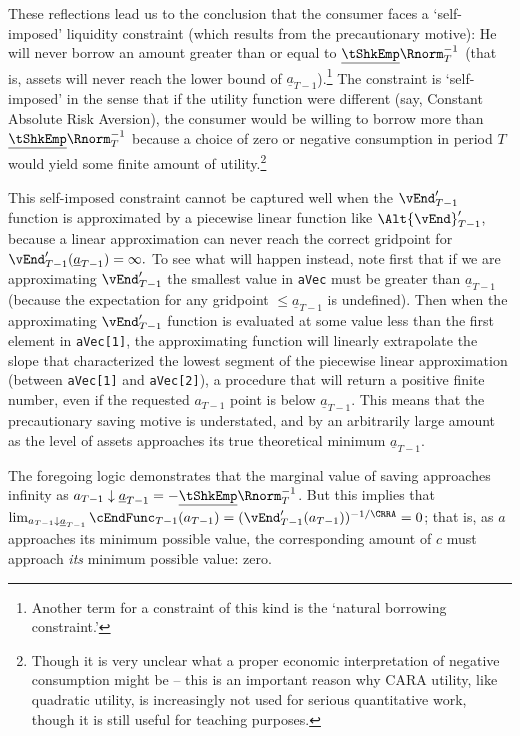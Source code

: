 \documentclass[titlepage]{\econtex}
\begin{document}
These reflections lead us to the conclusion that the consumer faces a
`self-imposed' liquidity constraint (which results from the
precautionary motive): He will never borrow an amount greater
than or equal to $\underline{\tShkEmp}\Rnorm_{T}^{-1}$ (that is,
assets will never reach the lower bound of
$\underline{a}_{T-1}$).\footnote{Another term for a constraint of this
  kind is the `natural borrowing constraint.'}  The constraint is
`self-imposed' in the sense that if the utility function were
different (say, Constant Absolute Risk Aversion), the consumer would
be willing to borrow more than $\underline{\tShkEmp}\Rnorm_{T}^{-1}$
because a choice of zero or negative consumption in period $T$ would
yield some finite amount of utility.\footnote{Though it is very unclear what a
  proper economic interpretation of negative consumption might be --
  this is an important reason why CARA utility, like quadratic utility,
  is increasingly not used for serious quantitative work, though it is
  still useful for teaching purposes.}

This self-imposed constraint cannot be captured well when the
$\vEnd^{\prime}_{T-1}$ function is approximated by a piecewise
linear function like $\Alt{\vEnd}^{\prime}_{T-1}$, because a
linear approximation can never reach the correct gridpoint for
$\vEnd^{\prime}_{T-1}(\underline{a}_{T-1})=\infty.$ To see what
will happen instead, note first that if we are approximating $\vEnd^{\prime}_{T-1}$ the smallest value in
\texttt{aVec} must be greater than $\underline{a}_{T-1}$
(because the expectation for any gridpoint $\leq \underline{a}_{T-1}$ is undefined).  Then when the
approximating $\vEnd^{\prime}_{T-1}$ function is evaluated at
some value less than the first element in \texttt{aVec[1]}, the
approximating function will linearly extrapolate the slope that
characterized the lowest segment of the piecewise linear approximation
(between \texttt{aVec[1]} and \texttt{aVec[2]}), a
procedure that will return a positive finite number, even if the
requested ${a}_{T-1}$ point is below $\underline{a}_{T-1}$.  This means that the
precautionary saving motive is understated, and by an arbitrarily
large amount as the level of assets approaches its true theoretical
minimum $\underline{a}_{T-1}$.

The foregoing logic demonstrates that the marginal value of saving approaches infinity as ${a}_{T-1} \downarrow
\underline{a}_{T-1}=-\underline{\tShkEmp}\Rnorm_{T}^{-1}$.  But this
implies that $\lim_{{a}_{T-1} \downarrow \underline{a}_{T-1}}
\cEndFunc_{T-1}({a}_{T-1}) = (\vEnd_{T-1}^{\prime}({a}_{T-1}))^{-1/\CRRA} = 0$;
that is, as ${a}$ approaches its minimum possible value, the
corresponding amount of ${c}$ must approach \textit{its} minimum possible value: zero.
\end{document}
